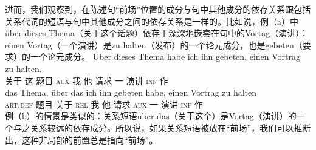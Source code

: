 进而，我们观察到，在陈述句“前场”位置的成分与句中其他成分的依存关系跟包括关系代词的短语与句中其他成分之间的依存关系是一样的。比如说，例（a）中über dieses Thema（关于这个话题）依存于深深地嵌套在句中的Vortag（演讲）：einen Vortag（一个演讲）是zu halten（发布）的一个论元成分，也是gebeten（要求）的一个论元成分。
\eal
\ex 
\gll Über dieses Thema habe ich ihn gebeten, einen Vortrag zu halten.\\
      关于 这 题目  \textsc{aux} 我   他 请求    一     演讲   \textsc{inf} 作\\
\ex 
\gll das Thema, über das ich ihn gebeten habe, einen Vortrag zu halten\\
     \textsc{art}.\textsc{def} 题目  关于  \textsc{rel} 我 他 请求  \textsc{aux} 一 演讲 \textsc{inf} 作\\
\zl
例（b）的情景是类似的：关系短语über das（关于这个）是Vortag（演讲）的一个与之关系较远的依存成分。所以说，如果关系短语被放在“前场”，我们可以推断出，这种非局部的前置总是指向“前场”。

